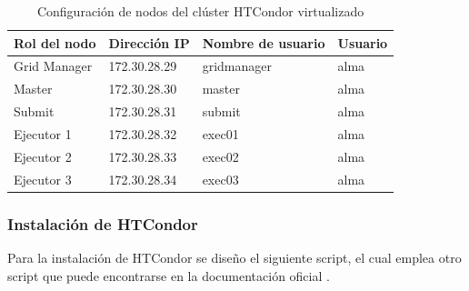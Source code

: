 \begin{table}[H]
	\centering
	\renewcommand{\arraystretch}{1.2} %
	\fontsize{9pt}{10pt}\selectfont %
	\begin{tabular}{|p{3cm}|p{3cm}|p{4.5cm}|p{2.5cm}|}  %
		\hline
		\textbf{Rol del nodo} & \textbf{Dirección IP} & \textbf{Nombre de usuario} & \textbf{Usuario} \\ \hline
		Grid Manager          & 172.30.28.29          & gridmanager                & alma             \\ \hline
		Master                & 172.30.28.30          & master                     & alma             \\ \hline
		Submit                & 172.30.28.31          & submit                     & alma             \\ \hline
		Ejecutor 1            & 172.30.28.32          & exec01                     & alma             \\ \hline
		Ejecutor 2            & 172.30.28.33          & exec02                     & alma             \\ \hline
		Ejecutor 3            & 172.30.28.34          & exec03                     & alma             \\ \hline
	\end{tabular}
	\caption{Configuración de nodos del clúster HTCondor virtualizado}
	\label{tab:nodos-htcondor}
\end{table}


\FloatBarrier\subsubsection{Instalación de HTCondor}

Para la instalación de HTCondor se diseño el siguiente script, el cual emplea otro script que puede encontrarse en la documentación oficial \cite{HTCondor-linux-install}.



